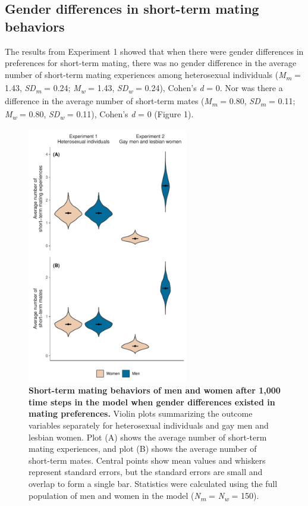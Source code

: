 \documentclass[
  11pt,
]{article}
\begin{document}
\hypertarget{gender-differences-in-short-term-mating-behaviors}{%
\subsection{Gender differences in short-term mating
behaviors}\label{gender-differences-in-short-term-mating-behaviors}}

The results from Experiment 1 showed that when there were gender
differences in preferences for short-term mating, there was no gender
difference in the average number of short-term mating experiences among
heterosexual individuals (\emph{M\textsubscript{m}} = 1.43,
\emph{SD\textsubscript{m}} = 0.24; \emph{M\textsubscript{w}} = 1.43,
\emph{SD\textsubscript{w}} = 0.24), Cohen's \emph{d} = 0. Nor was there
a difference in the average number of short-term mates
(\emph{M\textsubscript{m}} = 0.80, \emph{SD\textsubscript{m}} = 0.11;
\emph{M\textsubscript{w}} = 0.80, \emph{SD\textsubscript{w}} = 0.11),
Cohen's \emph{d} = 0 (Figure 1).

\begin{figure}[h]
  \centering
  \includegraphics[width=70mm]{figures/fig1_men_vs_women.pdf}
  \caption{\textbf{Short-term mating behaviors of men and women after 1,000 time steps in the model when gender differences existed in mating preferences.} Violin plots summarizing the outcome variables separately for heterosexual individuals and gay men and lesbian women. Plot (A) shows the average number of short-term mating experiences, and plot (B) shows the average number of short-term mates. Central points show mean values and whiskers represent standard errors, but the standard errors are small and overlap to form a single bar. Statistics were calculated using the full population of men and women in the model (\textit{N\textsubscript{m}} = \textit{N\textsubscript{w}} = 150).}
\end{figure}
\end{document}
